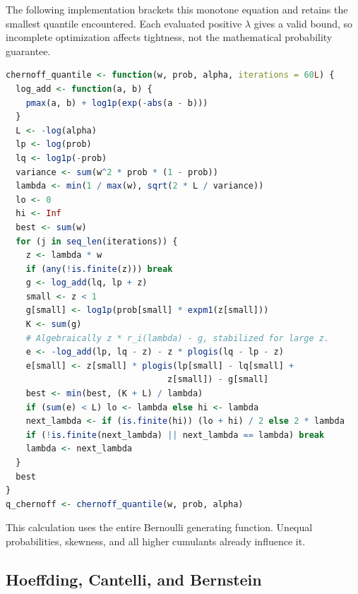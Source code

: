 \documentclass[11pt,letterpaper]{article}
\numberwithin{equation}{section}
\theoremstyle{definition}
\theoremstyle{remark}
\begin{document}
The following implementation brackets this monotone equation and retains
the smallest quantile encountered. Each evaluated positive $\lambda$ gives
a valid bound, so incomplete optimization affects tightness, not the
mathematical probability guarantee.
\par\noindent\begin{minipage}{\linewidth}
\begin{lstlisting}[language=R]
chernoff_quantile <- function(w, prob, alpha, iterations = 60L) {
  log_add <- function(a, b) {
    pmax(a, b) + log1p(exp(-abs(a - b)))
  }
  L <- -log(alpha)
  lp <- log(prob)
  lq <- log1p(-prob)
  variance <- sum(w^2 * prob * (1 - prob))
  lambda <- min(1 / max(w), sqrt(2 * L / variance))
  lo <- 0
  hi <- Inf
  best <- sum(w)
  for (j in seq_len(iterations)) {
    z <- lambda * w
    if (any(!is.finite(z))) break
    g <- log_add(lq, lp + z)
    small <- z < 1
    g[small] <- log1p(prob[small] * expm1(z[small]))
    K <- sum(g)
    # Algebraically z * r_i(lambda) - g, stabilized for large z.
    e <- -log_add(lp, lq - z) - z * plogis(lq - lp - z)
    e[small] <- z[small] * plogis(lp[small] - lq[small] +
                                z[small]) - g[small]
    best <- min(best, (K + L) / lambda)
    if (sum(e) < L) lo <- lambda else hi <- lambda
    next_lambda <- if (is.finite(hi)) (lo + hi) / 2 else 2 * lambda
    if (!is.finite(next_lambda) || next_lambda == lambda) break
    lambda <- next_lambda
  }
  best
}
q_chernoff <- chernoff_quantile(w, prob, alpha)
\end{lstlisting}
\end{minipage}\par

This calculation uses the entire Bernoulli generating function. Unequal
probabilities, skewness, and all higher cumulants already influence it.

\subsection{Hoeffding, Cantelli, and Bernstein}
\end{document}
